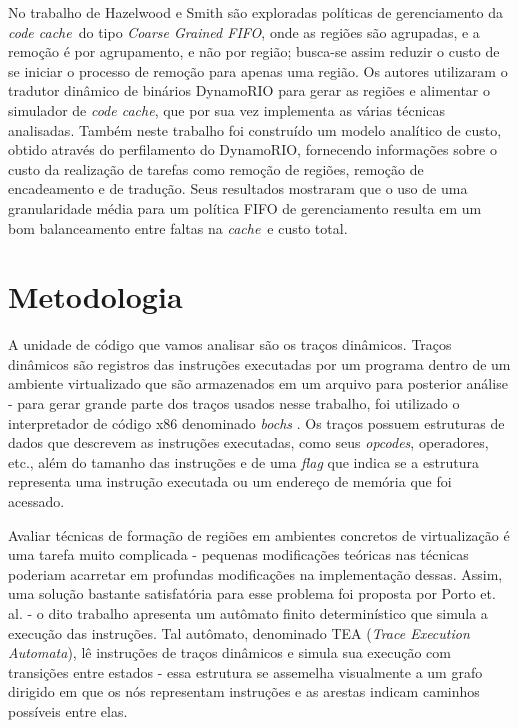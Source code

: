 \documentclass[12pt,twoside]{article}
\newcommand{\ccache}{\emph{code cache}}
\newcommand{\cache}{\emph{cache}}
\newcommand{\coarsefifo}{\emph{Coarse Grained FIFO}}
\begin{document}
No trabalho de Hazelwood e Smith \cite{kim-2004} são exploradas políticas de gerenciamento da \ccache~do tipo \coarsefifo, onde as regiões são agrupadas, e a remoção é por agrupamento, e não por região; busca-se assim reduzir o custo de se iniciar o processo de remoção para apenas uma região. Os autores utilizaram o tradutor dinâmico de binários DynamoRIO \cite{dynamorio-url} para gerar as regiões e alimentar o simulador de \ccache, que por sua vez implementa as várias técnicas analisadas. Também neste trabalho foi construído um modelo analítico de custo, obtido através do perfilamento do DynamoRIO, fornecendo informações sobre o custo da realização de tarefas como remoção de regiões, remoção de encadeamento e de tradução. Seus resultados mostraram que o uso de uma granularidade média para um política FIFO de gerenciamento resulta em um bom balanceamento entre faltas na \cache~e custo total.


\section{Metodologia}
\label{sec-metodologia}
A unidade de código que vamos analisar são os traços dinâmicos. Traços dinâmicos são registros das instruções executadas por um programa dentro de um ambiente virtualizado que são armazenados em um arquivo para posterior análise - para gerar grande parte dos traços usados nesse trabalho, foi utilizado o interpretador de código x86 denominado \emph{bochs} \cite{bochs-url}. Os traços possuem estruturas de dados que descrevem as instruções executadas, como seus \emph{opcodes}, operadores, etc., além do tamanho das instruções e de uma \emph{flag} que indica se a estrutura representa uma instrução executada ou um endereço de memória que foi acessado.

Avaliar técnicas de formação de regiões em ambientes concretos de virtualização é uma tarefa muito complicada - pequenas modificações teóricas nas técnicas poderiam acarretar em profundas modificações na implementação dessas. Assim, uma solução bastante satisfatória para esse problema foi proposta por Porto et. al. \cite{guido-2012} - o dito trabalho apresenta um autômato finito determinístico que simula a execução das instruções. Tal autômato, denominado TEA (\emph{Trace Execution Automata}), lê instruções de traços dinâmicos e simula sua execução com transições entre estados - essa estrutura se assemelha visualmente a um grafo dirigido em que os nós representam instruções e as arestas indicam caminhos possíveis entre elas.
\end{document}
